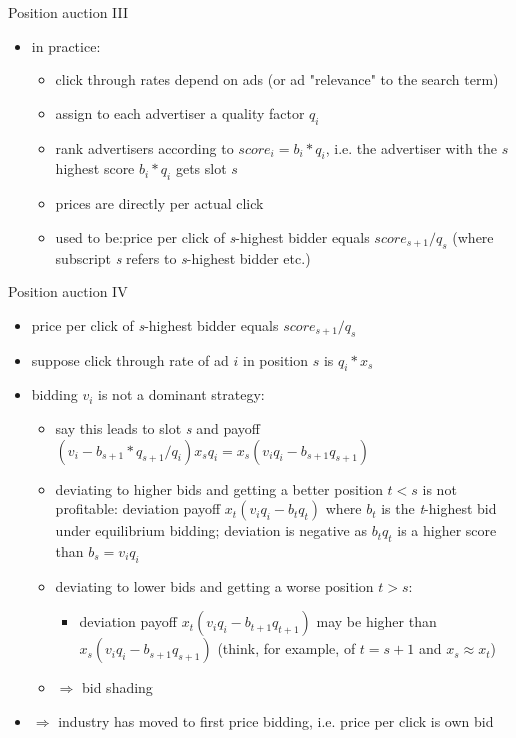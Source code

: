 \documentclass[bigger]{beamer}
\newcommand{\Ra}{\Rightarrow} \newcommand{\ra}{\rightarrow} \newcommand{\Lra}{\Leftrightarrow}
\begin{document}
\begin{frame}[label={sec:orgb65d6b8}]{Position auction III}
\begin{itemize}
\item in practice:
\begin{itemize}
\item click through rates depend on ads (or ad "relevance" to the search term)
\item assign to each advertiser a quality factor \(q_i\)
\item rank advertisers according to \(score_i=b_i*q_i\), i.e. the advertiser with the \(s\) highest score \(b_i*q_i\) gets slot \(s\)
\item prices are directly per actual click
\item used to be:\linebreak price per click of \emph{s}-highest bidder equals \(score_{s+1}/q_s\) (where subscript \emph{s} refers to \emph{s}-highest bidder etc.)
\end{itemize}
\end{itemize}
\end{frame}
\begin{frame}[label={sec:org74d693f}]{Position auction IV}
\begin{itemize}
\item price per click of \emph{s}-highest bidder equals \(score_{s+1}/q_s\)
\item suppose click through rate of ad \(i\) in position \(s\) is \(q_i*x_s\)
\item bidding \(v_i\) is not a dominant strategy:
\begin{itemize}
\item say this leads to slot \emph{s} and payoff \((v_i-b_{s+1}*q_{s+1}/q_i)x_s q_i=x_s(v_iq_i-b_{s+1}q_{s+1})\)
\item deviating to higher bids and getting a better position \(t<s\) is not profitable: deviation payoff \(x_t(v_iq_i-b_tq_t)\) where \(b_t\) is the \emph{t}-highest bid under equilibrium bidding; deviation is negative as \(b_tq_t\) is a higher score than \(b_s=v_i q_i\)
\item deviating to lower bids and getting a worse position \(t>s\):
\begin{itemize}
\item deviation payoff \(x_t(v_iq_i-b_{t+1}q_{t+1})\) may be higher than \(x_s(v_iq_i-b_{s+1}q_{s+1})\) (think, for example, of \(t=s+1\) and \(x_{s}\approx x_{t}\))
\end{itemize}
\item \(\Ra\) bid shading
\end{itemize}
\item \(\Ra\) industry has moved to first price bidding, i.e. price per click is own bid
\end{itemize}
\end{frame}
\end{document}

